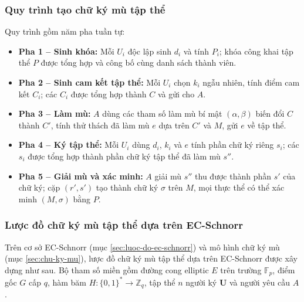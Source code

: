 \subsubsection{Quy trình tạo chữ ký mù tập thể}

Quy trình gồm năm pha tuần tự:

\begin{itemize}
    \item \textbf{Pha 1 -- Sinh khóa:} Mỗi $U_i$ độc lập sinh $d_i$ và tính $P_i$; khóa công khai tập thể $P$ được tổng hợp và công bố cùng danh sách thành viên.
    \item \textbf{Pha 2 -- Sinh cam kết tập thể:} Mỗi $U_i$ chọn $k_i$ ngẫu nhiên, tính điểm cam kết $C_i$; các $C_i$ được tổng hợp thành $C$ và gửi cho $A$.
    \item \textbf{Pha 3 -- Làm mù:} $A$ dùng các tham số làm mù bí mật $(\alpha, \beta)$ biến đổi $C$ thành $C'$, tính thử thách đã làm mù $e$ dựa trên $C'$ và $M$, gửi $e$ về tập thể.
    \item \textbf{Pha 4 -- Ký tập thể:} Mỗi $U_i$ dùng $d_i$, $k_i$ và $e$ tính phần chữ ký riêng $s_i$; các $s_i$ được tổng hợp thành phần chữ ký tập thể đã làm mù $s''$.
    \item \textbf{Pha 5 -- Giải mù và xác minh:} $A$ giải mù $s''$ thu được thành phần $s'$ của chữ ký; cặp $(r', s')$ tạo thành chữ ký $\sigma$ trên $M$, mọi thực thể có thể xác minh $(M, \sigma)$ bằng $P$.
\end{itemize}

\subsubsection{Lược đồ chữ ký mù tập thể dựa trên EC-Schnorr}

Trên cơ sở EC-Schnorr (mục \ref{sec:luoc-do-ec-schnorr}) và mô hình chữ ký mù (mục \ref{sec:chu-ky-mu}), lược đồ chữ ký mù tập thể dựa trên EC-Schnorr được xây dựng như sau. Bộ tham số miền gồm đường cong elliptic $E$ trên trường $\mathbb{F}_p$, điểm gốc $G$ cấp $q$, hàm băm $H: \{0,1\}^* \rightarrow \mathbb{Z}_q$, tập thể $n$ người ký $\mathbf{U}$ và người yêu cầu $A$.

